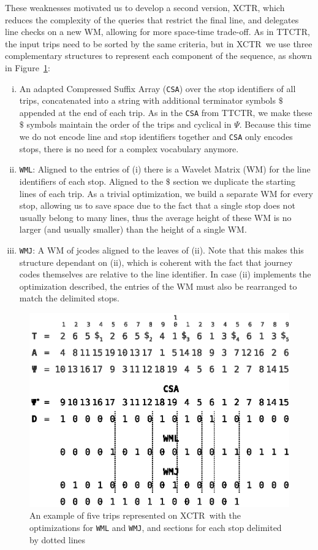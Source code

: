 \documentclass[runningheads]{llncs}
\newcommand{\ctr}{XCTR}
\newcommand{\ttctr}{TTCTR}
\begin{document}
These weaknesses motivated us to develop a second version, \ctr, which reduces the complexity of the queries that restrict the final line, and delegates line checks on a new WM, allowing for more space-time trade-off. As in \ttctr, the input trips need to be sorted by the same criteria, but in \ctr~we use three complementary structures to represent each component of the sequence, as shown in Figure~\ref{fig:example_xctr}:
\begin{enumerate}[(i)]
    \item An adapted Compressed Suffix Array (\texttt{CSA}) over the stop identifiers of all trips, concatenated into a string with additional terminator symbols $\$$ appended at the end of each trip. As in the \texttt{CSA} from \ttctr, we make these $\$$ symbols maintain the order of the trips and cyclical in $\Psi$. Because this time we do not encode line and stop identifiers together and \texttt{CSA} only encodes stops, there is no need for a complex vocabulary anymore.
    \item \texttt{WML}: Aligned to the entries of (i) there is a Wavelet Matrix (WM) for the line identifiers of each stop. Aligned to the $\$$ section we duplicate the starting lines of each trip. As a trivial optimization, we build a separate WM for every stop, allowing us to save space due to the fact that a single stop does not usually belong to many lines, thus the average height of these WM is no larger (and usually smaller) than the height of a single WM.
    \item \texttt{WMJ}: A WM of jcodes aligned to the leaves of (ii). Note that this makes this structure dependant on (ii), which is coherent with the fact that journey codes themselves are relative to the line identifier. In case (ii) implements the optimization described, the entries of the WM must also be rearranged to match the delimited stops.
\end{enumerate}

\begin{figure}[hbt!]
\includegraphics[width=\textwidth]{example_xctr.eps}
\caption{An example of five trips represented on \ctr~with the optimizations for \texttt{WML} and \texttt{WMJ}, and sections for each stop delimited by dotted lines}
\label{fig:example_xctr}
\end{figure}
\end{document}
